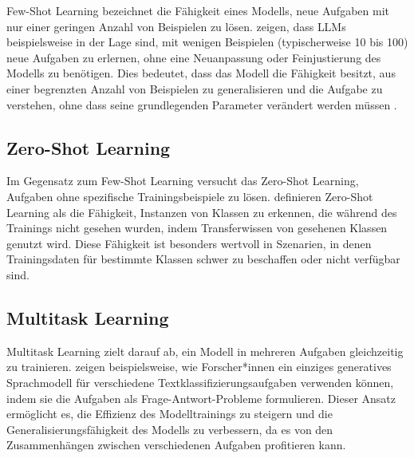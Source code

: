 Few-Shot Learning bezeichnet die Fähigkeit eines Modells, neue Aufgaben mit nur einer geringen Anzahl von Beispielen zu lösen. \textcite{BrownTomB2020LMaF} zeigen, dass \glspl{LLM} beispielsweise in der Lage sind, mit wenigen Beispielen (typischerweise 10 bis 100) neue Aufgaben zu erlernen, ohne eine Neuanpassung oder Feinjustierung des Modells zu benötigen. Dies bedeutet, dass das Modell die Fähigkeit besitzt, aus einer begrenzten Anzahl von Beispielen zu generalisieren und die Aufgabe zu verstehen, ohne dass seine grundlegenden Parameter verändert werden müssen \cite{BrownTomB2020LMaF}.

\subsection{Zero-Shot Learning}
\label{subsec:zero-shot-learning}

Im Gegensatz zum Few-Shot Learning versucht das Zero-Shot Learning, Aufgaben ohne spezifische Trainingsbeispiele zu lösen. \textcite{XianYongqin2019ZLCE} definieren Zero-Shot Learning als die Fähigkeit, Instanzen von Klassen zu erkennen, die während des Trainings nicht gesehen wurden, indem Transferwissen von gesehenen Klassen genutzt wird. Diese Fähigkeit ist besonders wertvoll in Szenarien, in denen Trainingsdaten für bestimmte Klassen schwer zu beschaffen oder nicht verfügbar sind.

\subsection{Multitask Learning}
\label{subsec:multitask-learning}

Multitask Learning zielt darauf ab, ein Modell in mehreren Aufgaben gleichzeitig zu trainieren. \textcite{PuriRaul2019ZTCW} zeigen beispielsweise, wie Forscher*innen ein einziges generatives Sprachmodell für verschiedene Textklassifizierungsaufgaben verwenden können, indem sie die Aufgaben als Frage-Antwort-Probleme formulieren. Dieser Ansatz ermöglicht es, die Effizienz des Modelltrainings zu steigern und die Generalisierungsfähigkeit des Modells zu verbessern, da es von den Zusammenhängen zwischen verschiedenen Aufgaben profitieren kann.